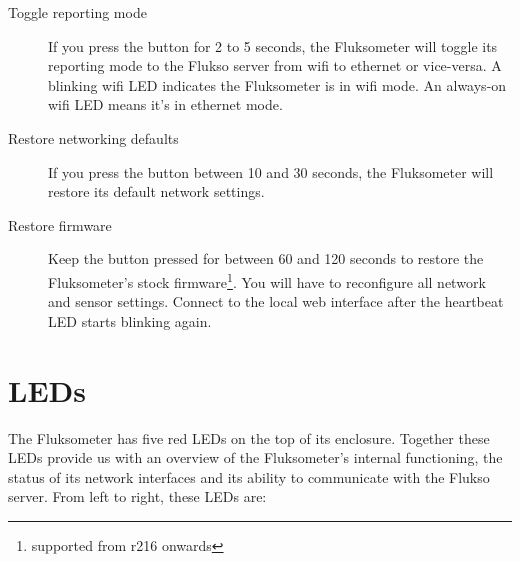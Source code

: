 \begin{description}

\item[Toggle reporting mode] If you press the button for 2 to 5 seconds, the Fluksometer will toggle its reporting mode to the Flukso server from wifi to ethernet or vice-versa. A blinking wifi LED indicates the Fluksometer is in wifi mode. An always-on wifi LED means it's in ethernet mode.
\item[Restore networking defaults] If you press the button between 10 and 30 seconds, the Fluksometer will restore its default network settings.
\item[Restore firmware] Keep the button pressed for between 60 and 120 seconds to restore the Fluksometer's stock firmware\footnote{supported from r216 onwards}. You will have to reconfigure all network and sensor settings. Connect to the local web interface after the heartbeat LED starts blinking again.
\end{description}


\section{LEDs}
The Fluksometer has five red LEDs on the top of its enclosure. Together these LEDs provide us with an overview of the Fluksometer's internal functioning, the status of its network interfaces and its ability to communicate with the Flukso server. From left to right, these LEDs are:


